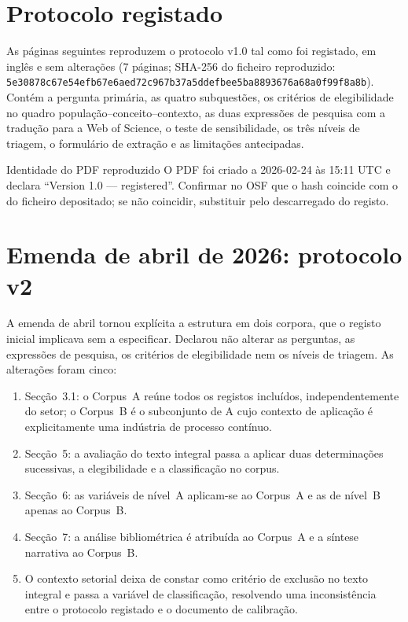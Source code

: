 \section{Protocolo registado}
\label{sec:apA-protocolo}

As páginas seguintes reproduzem o protocolo v1.0 tal como foi registado, em inglês e sem alterações (7 páginas; SHA-256 do ficheiro reproduzido: \texttt{5e30878c\allowbreak 67e54efb\allowbreak 67e6aed7\allowbreak 2c967b37\allowbreak a5ddefbe\allowbreak e5ba8893\allowbreak 676a68a0\allowbreak f99f8a8b}). Contém a pergunta primária, as quatro subquestões, os critérios de elegibilidade no quadro população--conceito--contexto, as duas expressões de pesquisa com a tradução para a Web of Science, o teste de sensibilidade, os três níveis de triagem, o formulário de extração e as limitações antecipadas.

{Identidade do PDF reproduzido}
{O PDF foi criado a 2026-02-24 às 15:11 UTC e declara ``Version 1.0 --- registered''. Confirmar no OSF que o hash coincide com o do ficheiro depositado; se não coincidir, substituir pelo descarregado do registo.}



\section{Emenda de abril de 2026: protocolo v2}
\label{sec:apA-v2}

A emenda de abril tornou explícita a estrutura em dois corpora, que o registo inicial implicava sem a especificar. Declarou não alterar as perguntas, as expressões de pesquisa, os critérios de elegibilidade nem os níveis de triagem. As alterações foram cinco:
\begin{enumerate}[nosep]
  \item Secção~3.1: o Corpus~A reúne todos os registos incluídos, independentemente do setor; o Corpus~B é o subconjunto de A cujo contexto de aplicação é explicitamente uma indústria de processo contínuo.
  \item Secção~5: a avaliação do texto integral passa a aplicar duas determinações sucessivas, a elegibilidade e a classificação no corpus.
  \item Secção~6: as variáveis de nível~A aplicam-se ao Corpus~A e as de nível~B apenas ao Corpus~B.
  \item Secção~7: a análise bibliométrica é atribuída ao Corpus~A e a síntese narrativa ao Corpus~B.
  \item O contexto setorial deixa de constar como critério de exclusão no texto integral e passa a variável de classificação, resolvendo uma inconsistência entre o protocolo registado e o documento de calibração.
\end{enumerate}

